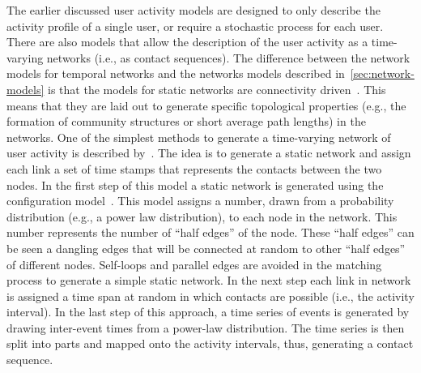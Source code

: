 The earlier discussed user activity models are designed to only describe the activity profile of a single user, or require a stochastic process for each user.
There are also models that allow the description of the user activity as a time-varying networks (i.e., as contact sequences).
The difference between the network models for temporal networks and the networks models described in~\autoref{sec:network-models} is that the models for static networks are connectivity driven~\cite{Perra2012a}.
This means that they are laid out to generate specific topological properties (e.g., the formation of community structures or short average path lengths) in the networks.
One of the simplest methods to generate a time-varying network of user activity is described by~\citet{Holme2013}.
The idea is to generate a static network and assign each link a set of time stamps that represents the contacts between the two nodes.
In the first step of this model a static network is generated using the configuration model~\cite[cf. sec. 13.2]{Newman2010}.
This model assigns a number, drawn from a probability distribution (e.g., a power law distribution), to each node in the network.
This number represents the number of \enquote{half edges} of the node.
These \enquote{half edges} can be seen a dangling edges that will be connected at random to other \enquote{half edges} of different nodes.
Self-loops and parallel edges are avoided in the matching process to generate a simple static network.
In the next step each link in network is assigned a time span at random in which contacts are possible (i.e., the activity interval).
In the last step of this approach, a time series of events is generated by drawing inter-event times from a power-law distribution.
The time series is then split into parts and mapped onto the activity intervals, thus, generating a contact sequence.

